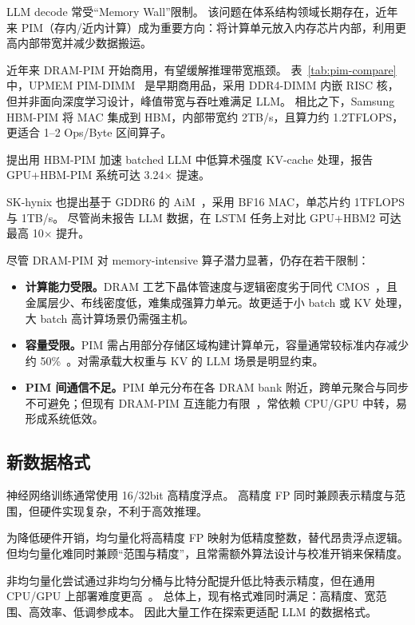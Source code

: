 LLM decode 常受“Memory Wall”限制。
该问题在体系结构领域长期存在，近年来 PIM（存内/近内计算）成为重要方向：将计算单元放入内存芯片内部，利用更高内部带宽并减少数据搬运。

近年来 DRAM-PIM 开始商用，有望缓解推理带宽瓶颈。
表~\ref{tab:pim-compare} 中，UPMEM PIM-DIMM~\cite{upmem} 是早期商用品，采用 DDR4-DIMM 内嵌 RISC 核，但并非面向深度学习设计，峰值带宽与吞吐难满足 LLM。
相比之下，Samsung HBM-PIM 将 MAC 集成到 HBM，内部带宽约 2TB/s，且算力约 1.2TFLOPS，更适合 1--2 Ops/Byte 区间算子。

\cite{choi2023unleashing} 提出用 HBM-PIM 加速 batched LLM 中低算术强度 KV-cache 处理，报告 GPU+HBM-PIM 系统可达 3.24$\times$ 提速。

SK-hynix 也提出基于 GDDR6 的 AiM~\cite{gddr-pim}，采用 BF16 MAC，单芯片约 1TFLOPS 与 1TB/s。
尽管尚未报告 LLM 数据，在 LSTM 任务上对比 GPU+HBM2 可达最高 10$\times$ 提升。

尽管 DRAM-PIM 对 memory-intensive 算子潜力显著，仍存在若干限制：
\begin{itemize}
\item \textbf{计算能力受限。}DRAM 工艺下晶体管速度与逻辑密度劣于同代 CMOS~\cite{devaux2019true}，且金属层少、布线密度低，难集成强算力单元。故更适于小 batch 或 KV 处理，大 batch 高计算场景仍需强主机。
\item \textbf{容量受限。}PIM 需占用部分存储区域构建计算单元，容量通常较标准内存减少约 50\%~\cite{hbm-pim}。对需承载大权重与 KV 的 LLM 场景是明显约束。
\item \textbf{PIM 间通信不足。}PIM 单元分布在各 DRAM bank 附近，跨单元聚合与同步不可避免；但现有 DRAM-PIM 互连能力有限~\cite{zhou2023dimm,jonatan2024scalability}，常依赖 CPU/GPU 中转，易形成系统低效。
\end{itemize}



\subsection{新数据格式}
\label{sec:dataformat}

神经网络训练通常使用 16/32bit 高精度浮点。
高精度 FP 同时兼顾表示精度与范围，但硬件实现复杂，不利于高效推理。

为降低硬件开销，均匀量化将高精度 FP 映射为低精度整数，替代昂贵浮点逻辑。
但均匀量化难同时兼顾“范围与精度”，且常需额外算法设计与校准开销来保精度。

非均匀量化尝试通过非均匀分桶与比特分配提升低比特表示精度，但在通用 CPU/GPU 上部署难度更高~\citep{gholami2022survey}。
总体上，现有格式难同时满足：高精度、宽范围、高效率、低调参成本。
因此大量工作在探索更适配 LLM 的数据格式。

